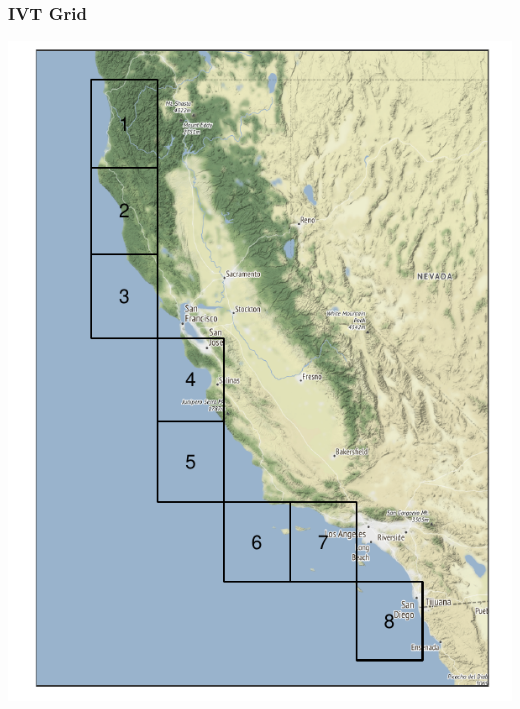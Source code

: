 \documentclass[aspectratio=169,10pt]{beamer}
\newlength{\frametextheight}
\begin{document}
\begin{frame}
    \frametitle{IVT Grid}
    \begin{minipage}{.49\textwidth}
        \centering
        \includegraphics[height=\frametextheight]{./ch1/images/erai_grid}
    \end{minipage}
    \begin{minipage}{.49\textwidth}
        \centering

\end{minipage}
\end{frame}
\end{document}
